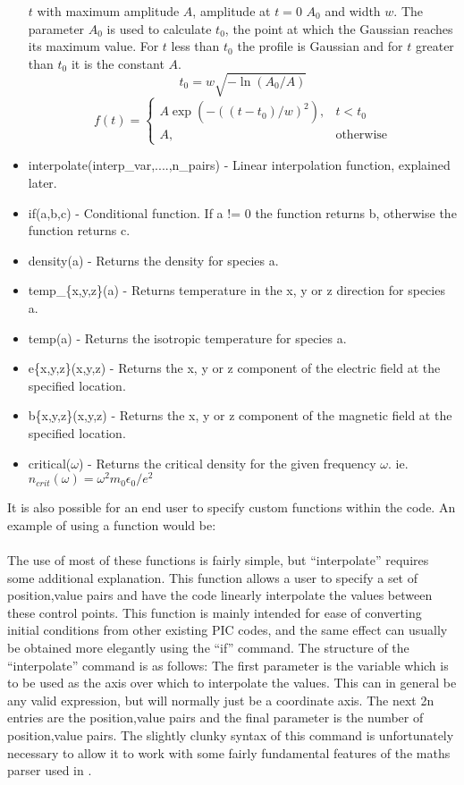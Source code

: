 \begin{itemize}
    $t$ with maximum amplitude $A$, amplitude at $t=0$ $A_0$ and width $w$.
    The parameter $A_0$ is used to calculate $t_0$, the point at which the
    Gaussian reaches its maximum value. For $t$ less than $t_0$ the profile
    is Gaussian and for $t$ greater than $t_0$ it is the constant $A$.
\[
t_0 = w\sqrt{-\ln{(A_0/A)}}
\]\[
f(t) =
\begin{cases}
A \exp{(-((t-t_0)/w)^2)}, & t < t_0 \\
A, & \mbox{otherwise}
\end{cases}
\]
\item interpolate(interp\_var,....,n\_pairs) - Linear interpolation function,
  explained later.
\item if(a,b,c) - Conditional function. If a != 0 the function returns b,
  otherwise the function returns c.

\item density(a) - Returns the density for species a.
\item temp\_\{x,y,z\}(a) - Returns temperature in the x, y or z direction for
    species a.
\item temp(a) - Returns the isotropic temperature for species a.
\item e\{x,y,z\}(x,y,z) - Returns the x, y or z component of the electric
    field at the specified location.
\item b\{x,y,z\}(x,y,z) - Returns the x, y or z component of the magnetic
    field at the specified location.
\item critical($\omega$) - Returns the critical density for the given
    frequency $\omega$. ie. $n_{crit}(\omega) = \omega^2 m_0 \epsilon_0 / e^2$
\end{itemize}

It is also possible for an end user to specify custom functions within the
code. An example of using a function would be:\\
\indent{}\\

The use of most of these functions is fairly simple, but
``interpolate'' requires some additional explanation. This function allows a
user to specify a set of position,value pairs and have the code linearly
interpolate the values between these control points. This function is mainly
intended for ease of converting initial conditions from other existing PIC
codes, and the same effect can usually be obtained more elegantly using the
``if'' command. The structure of the ``interpolate'' command is as follows:
The first parameter is the variable which is to be used as the axis over which
to interpolate the values. This can in general be any valid expression, but
will normally just be a coordinate axis. The next 2n entries are the
position,value pairs and the final parameter is the number of position,value
pairs. The slightly clunky syntax of this command is unfortunately necessary to
allow it to work with some fairly fundamental features of the maths parser
used in {\EPOCH}.


